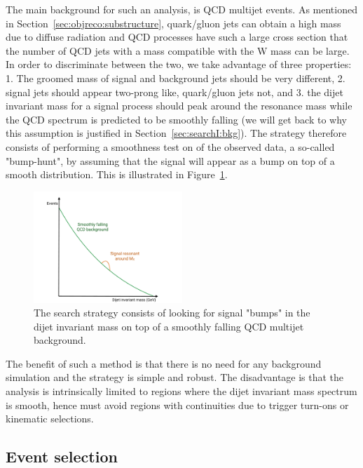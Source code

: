 The main background for such an analysis, is QCD multijet events. As mentioned in Section~\ref{sec:objreco:substructure}, quark/gluon jets can obtain a high mass due to diffuse radiation and QCD processes have such a large cross section that the number of QCD jets with a mass compatible with the W mass can be large. In order to discriminate between the two, we take advantage of three properties: 1. The groomed mass of signal and background jets should be very different, 2. signal jets should appear two-prong like, quark/gluon jets not, and 3. the dijet invariant mass for a signal process should peak around the resonance mass while the QCD spectrum is predicted to be smoothly falling (we will get back to why this assumption is justified in Section~\ref{sec:searchI:bkg}). The strategy therefore consists of performing a smoothness test on \mjj of the observed data, a so-called "bump-hunt", by assuming that the signal will appear as a bump on top of a smooth distribution. This is illustrated in Figure~\ref{fig:searchI:bumphunt}.

\begin{figure}[ht] 
    \centering
    \includegraphics[width=0.50\textwidth]{figures/analysis/search1/misc/sigExtraction.pdf}
    \caption{The search strategy consists of looking for signal "bumps" in the dijet invariant mass on top of a smoothly falling QCD multijet background.}
    \label{fig:searchI:bumphunt}
\end{figure}

The benefit of such a method is that there is no need for any background simulation and the strategy is simple and robust. The disadvantage is that the analysis is intrinsically limited to regions where the dijet invariant mass spectrum is smooth, hence must avoid regions with continuities due to trigger turn-ons or kinematic selections.

\subsection{Event selection}

